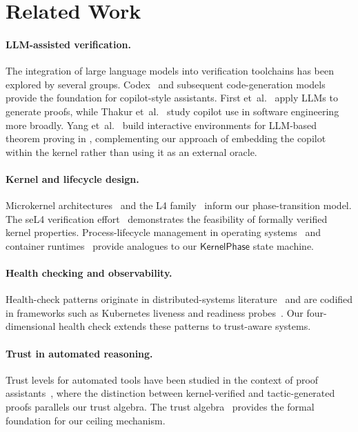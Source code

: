 \documentclass[11pt]{article}
\newcommand{\KP}{\mathsf{KernelPhase}}
\begin{document}
\section{Related Work}\label{sec:related}

\paragraph{LLM-assisted verification.}
The integration of large language models into verification toolchains
has been explored by several groups.  Codex~\cite{chen2021codex} and
subsequent code-generation models~\cite{li2023starcoder,
roziere2023codellama} provide the foundation for copilot-style
assistants.  First et~al.~\cite{first2023baldur} apply LLMs to
generate \LEAN{} proofs, while Thakur et~al.~\cite{thakur2023copilot}
study copilot use in software engineering more broadly.
Yang et~al.~\cite{yang2024leandojo} build interactive environments
for LLM-based theorem proving in \LEAN, complementing our approach
of embedding the copilot within the kernel rather than using it as
an external oracle.

\paragraph{Kernel and lifecycle design.}
Microkernel architectures~\cite{liedtke1995microkernel} and the
L4 family~\cite{klein2009sel4} inform our phase-transition model.
The seL4 verification effort~\cite{klein2009sel4} demonstrates the
feasibility of formally verified kernel properties.
Process-lifecycle management in operating
systems~\cite{tanenbaum2014modern} and container
runtimes~\cite{bernstein2014containers} provide analogues to our
$\KP$ state machine.

\paragraph{Health checking and observability.}
Health-check patterns originate in distributed-systems
literature~\cite{burns2016borg, verma2015large} and are codified in
frameworks such as Kubernetes liveness and readiness
probes~\cite{burns2019kubernetes}.  Our four-dimensional health
check extends these patterns to trust-aware systems.

\paragraph{Trust in automated reasoning.}
Trust levels for automated tools have been studied in the context of
proof assistants~\cite{barendregt2001proofassistants,
wiedijk2006qed}, where the distinction between kernel-verified and
tactic-generated proofs parallels our trust algebra.
The \JuGeo{} trust algebra~\cite{young2024jugeo} provides the
formal foundation for our ceiling mechanism.
\end{document}
